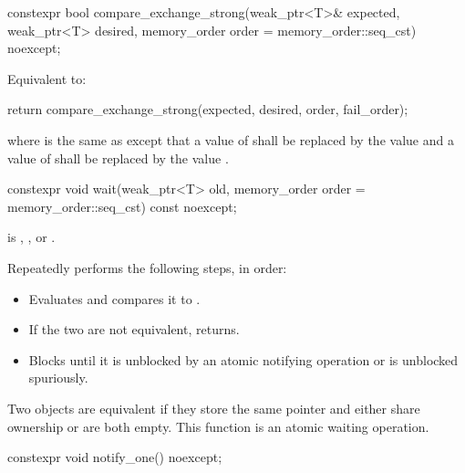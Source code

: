 %
\begin{itemdecl}
constexpr bool compare_exchange_strong(weak_ptr<T>& expected, weak_ptr<T> desired,
                                       memory_order order = memory_order::seq_cst) noexcept;
\end{itemdecl}

\begin{itemdescr}
\pnum
\effects
Equivalent to:
\begin{codeblock}
return compare_exchange_strong(expected, desired, order, fail_order);
\end{codeblock}
where  is the same as 
except that a value of 
shall be replaced by the value  and
a value of 
shall be replaced by the value .
\end{itemdescr}

%
\begin{itemdecl}
constexpr void wait(weak_ptr<T> old, memory_order order = memory_order::seq_cst) const noexcept;
\end{itemdecl}

\begin{itemdescr}
\pnum
\expects
{} is
,
, or
.

\pnum
\effects
Repeatedly performs the following steps, in order:
\begin{itemize}
\item
  Evaluates  and compares it to .
\item
  If the two are not equivalent, returns.
\item
  Blocks until it
  is unblocked by an atomic notifying operation or is unblocked spuriously.
\end{itemize}

\pnum
\remarks
Two  objects are equivalent
if they store the same pointer and either share ownership or are both empty.
This function is an atomic waiting operation.
\end{itemdescr}


%
\begin{itemdecl}
constexpr void notify_one() noexcept;
\end{itemdecl}

